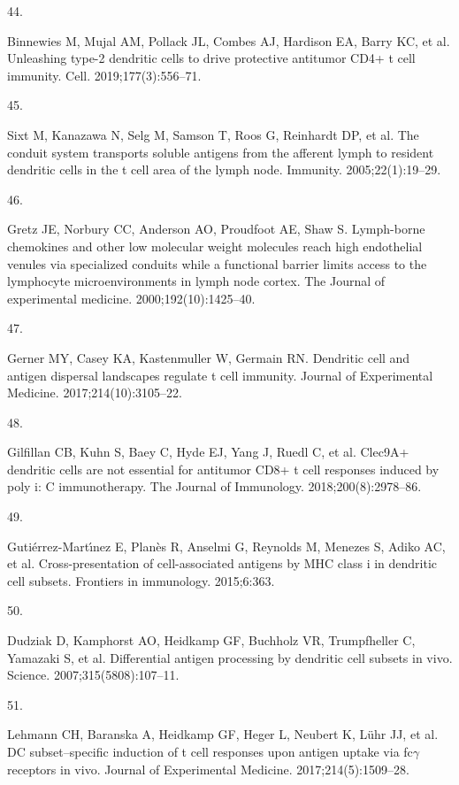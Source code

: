 \documentclass[
]{article}
\newlength{\cslhangindent}
\newlength{\csllabelwidth}
\newenvironment{CSLReferences}[2] %
 {\begin{list}{}{%
  \setlength{\itemindent}{0pt}
  \setlength{\leftmargin}{0pt}
  \setlength{\parsep}{0pt}
  \ifodd #1
   \setlength{\leftmargin}{\cslhangindent}
   \setlength{\itemindent}{-1\cslhangindent}
  \fi
  \setlength{\itemsep}{#2\baselineskip}}}
 {\end{list}}
\newcommand{\CSLLeftMargin}[1]{\parbox[t]{\csllabelwidth}{\strut#1\strut}}
\newcommand{\CSLRightInline}[1]{\parbox[t]{\linewidth - \csllabelwidth}{\strut#1\strut}}
\begin{document}
\begin{CSLReferences}{0}{1}
\CSLLeftMargin{44. }%
\CSLRightInline{Binnewies M, Mujal AM, Pollack JL, Combes AJ, Hardison
EA, Barry KC, et al. Unleashing type-2 dendritic cells to drive
protective antitumor CD4+ t cell immunity. Cell. 2019;177(3):556--71. }

\CSLLeftMargin{45. }%
\CSLRightInline{Sixt M, Kanazawa N, Selg M, Samson T, Roos G, Reinhardt
DP, et al. The conduit system transports soluble antigens from the
afferent lymph to resident dendritic cells in the t cell area of the
lymph node. Immunity. 2005;22(1):19--29. }

\CSLLeftMargin{46. }%
\CSLRightInline{Gretz JE, Norbury CC, Anderson AO, Proudfoot AE, Shaw S.
Lymph-borne chemokines and other low molecular weight molecules reach
high endothelial venules via specialized conduits while a functional
barrier limits access to the lymphocyte microenvironments in lymph node
cortex. The Journal of experimental medicine. 2000;192(10):1425--40. }

\CSLLeftMargin{47. }%
\CSLRightInline{Gerner MY, Casey KA, Kastenmuller W, Germain RN.
Dendritic cell and antigen dispersal landscapes regulate t cell
immunity. Journal of Experimental Medicine. 2017;214(10):3105--22. }

\CSLLeftMargin{48. }%
\CSLRightInline{Gilfillan CB, Kuhn S, Baey C, Hyde EJ, Yang J, Ruedl C,
et al. Clec9A+ dendritic cells are not essential for antitumor CD8+ t
cell responses induced by poly i: C immunotherapy. The Journal of
Immunology. 2018;200(8):2978--86. }

\CSLLeftMargin{49. }%
\CSLRightInline{Gutiérrez-Martı́nez E, Planès R, Anselmi G, Reynolds M,
Menezes S, Adiko AC, et al. Cross-presentation of cell-associated
antigens by MHC class i in dendritic cell subsets. Frontiers in
immunology. 2015;6:363. }

\CSLLeftMargin{50. }%
\CSLRightInline{Dudziak D, Kamphorst AO, Heidkamp GF, Buchholz VR,
Trumpfheller C, Yamazaki S, et al. Differential antigen processing by
dendritic cell subsets in vivo. Science. 2007;315(5808):107--11. }

\CSLLeftMargin{51. }%
\CSLRightInline{Lehmann CH, Baranska A, Heidkamp GF, Heger L, Neubert K,
Lühr JJ, et al. DC subset--specific induction of t cell responses upon
antigen uptake via fc\(\gamma\) receptors in vivo. Journal of
Experimental Medicine. 2017;214(5):1509--28. }


\end{CSLReferences}
\end{document}
